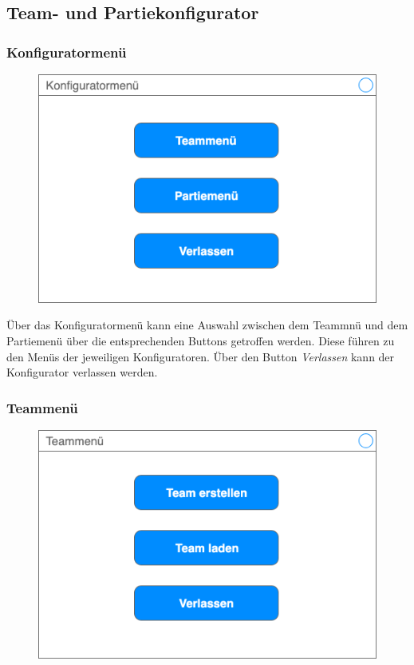 \subsection{Team- und Partiekonfigurator}

    \subsubsection{Konfiguratormenü}

    \begin{figure}[H]
        \centering
        \includegraphics[width=\textwidth/2]{images/konfiguratormenue}
    \end{figure}

    Über das Konfiguratormenü kann eine Auswahl zwischen dem Teammnü und dem Partiemenü über die entsprechenden Buttons getroffen werden. Diese führen zu den Menüs der jeweiligen Konfiguratoren. Über den Button \textit{Verlassen} kann der Konfigurator verlassen werden.

    \subsubsection{Teammenü}
    \begin{figure}[H]
        \centering
        \includegraphics[width=\textwidth/2]{images/teammenue}
    \end{figure}

